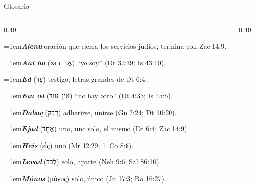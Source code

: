 \documentclass[hyperref={bookmarks=false},aspectratio=169]{beamer}
\newcommand{\heb}[1]{\mbox{\foreignlanguage{hebrew}{#1}}}
\newcommand{\grc}[1]{\foreignlanguage{ancientgreek}{#1}}
\begin{document}
\begin{frame}{Glosario}
\scriptsize\RaggedRight
\begin{columns}[t,onlytextwidth]
\begin{column}{0.49\textwidth}

\par\noindent\hangindent=1em{\color{azul}\textbf{\emph{Alenu}}} oración que cierra los servicios judíos; termina con Zac 14:9.\par\vspace{2pt}
\par\noindent\hangindent=1em{\color{azul}\textbf{\emph{Ani hu}}} (\heb{אֲנִי הוּא}) ``yo soy'' (Dt 32:39; Is 43:10).\par\vspace{2pt}
\par\noindent\hangindent=1em{\color{azul}\textbf{\emph{Ed}}} (\heb{עֵד}) testigo; letras grandes de Dt 6:4.\par\vspace{2pt}
\par\noindent\hangindent=1em{\color{azul}\textbf{\emph{Ein od}}} (\heb{אֵין עוֹד}) ``no hay otro'' (Dt 4:35; Is 45:5).\par\vspace{2pt}
\par\noindent\hangindent=1em{\color{azul}\textbf{\emph{Dabaq}}} (\heb{דָּבַק}) adherirse, unirse (Gn 2:24; Dt 10:20).\par\vspace{2pt}
\par\noindent\hangindent=1em{\color{azul}\textbf{\emph{Ejad}}} (\heb{אֶחָד}) uno, uno solo, el mismo (Dt 6:4; Zac 14:9).\par\vspace{2pt}
\par\noindent\hangindent=1em{\color{azul}\textbf{\emph{Heîs}}} (\grc{εἷς}) uno (Mr 12:29; 1~Co 8:6).\par\vspace{2pt}
\par\noindent\hangindent=1em{\color{azul}\textbf{\emph{Levad}}} (\heb{לְבַד}) solo, aparte (Neh 9:6; Sal 86:10).\par\vspace{2pt}
\par\noindent\hangindent=1em{\color{azul}\textbf{\emph{Mónos}}} (\grc{μόνος}) solo, único (Jn 17:3; Ro 16:27).\par\vspace{2pt}

\end{column}
\begin{column}{0.49\textwidth}


\end{column}
\end{columns}
\end{frame}
\end{document}
